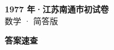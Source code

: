 \documentclass[zihao=-4, a4paper]{ctexart}
\begin{document}
\begin{center}
  {\Large\bfseries 1977 年·江苏南通市初试卷}\\[4pt]
  {\large 数学 · 简答版}
\end{center}
\medskip
{}

\clearpage
{}
\begin{center}{\Large\bfseries 答案速查}\end{center}
\medskip

\end{document}
